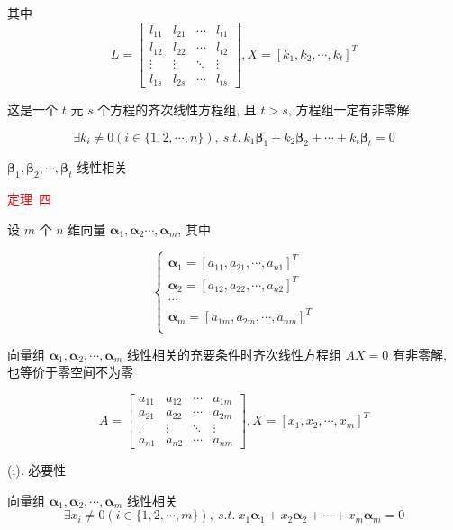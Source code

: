 \begin{theorem}[判别线性相关性的七大定理]
\begin{anymark}[证明]
		其中
		$$L = \begin{bmatrix}
			l_{11} & l_{21} & \cdots & l_{t1}\\
			l_{12} & l_{22} & \cdots & l_{t2}\\
			\vdots & \vdots & \ddots & \vdots\\
			l_{1s} & l_{2s} & \cdots & l_{ts}
		\end{bmatrix}, X = [k_{1},k_{2},\cdots,k_{t}]^{T}$$
		
		这是一个 $t$ 元 $s$ 个方程的齐次线性方程组, 且 $t > s$, 方程组一定有非零解 

		$$\exists k_{i}\neq 0(i\in\{1,2,\cdots,n\}), \ s.t. \ k_{1}\boldsymbol{\beta}_{1} + k_{2}\boldsymbol{\beta}_{2} + \cdots + k_{t}\boldsymbol{\beta}_{t}=0$$
		
		$\boldsymbol{\beta}_{1},\boldsymbol{\beta}_{2},\cdots,\boldsymbol{\beta}_{t}$ 线性相关
	\end{anymark}

	\textcolor{red}{定理\ 四}
	
	设 $m$ 个 $n$ 维向量 $\boldsymbol{\alpha}_{1},\boldsymbol{\alpha}_{2}\cdots,\boldsymbol{\alpha}_{m}$, 其中
	
	$$\begin{cases}
		\boldsymbol{\alpha}_{1}=[a_{11},a_{21},\cdots,a_{n1}]^{T}\\
		\boldsymbol{\alpha}_{2}=[a_{12},a_{22},\cdots,a_{n2}]^{T}\\
		\cdots\\
		\boldsymbol{\alpha}_{m}=[a_{1m},a_{2m},\cdots,a_{nm}]^{T}\\
	\end{cases}$$

	向量组 $\boldsymbol{\alpha}_{1},\boldsymbol{\alpha}_{2}, \cdots, \boldsymbol{\alpha}_{m}$ 线性相关的充要条件时齐次线性方程组 $AX = 0$ 有非零解, 也等价于零空间不为零

	$$A = \begin{bmatrix}
		a_{11} & a_{12} & \cdots & a_{1m}\\
		a_{21} & a_{22} & \cdots & a_{2m}\\
		\vdots & \vdots & \ddots & \vdots\\
		a_{n1} & a_{n2} & \cdots & a_{nm}
	\end{bmatrix}, X=[x_{1},x_{2},\cdots,x_{m}]^{T}$$
	
	\begin{anymark}[证明]
		(i). 必要性
		
		向量组 $\boldsymbol{\alpha}_{1},\boldsymbol{\alpha}_{2}, \cdots, \boldsymbol{\alpha}_{m}$ 线性相关  
		$$\exists x_{i}\neq 0(i\in \{1,2,\cdots,m\}),\ s.t.\ x_{1}\boldsymbol{\alpha}_{1} + x_{2}\boldsymbol{\alpha}_{2} + \cdots + x_{m}\boldsymbol{\alpha}_{m}=0$$


\end{anymark}
\end{theorem}
